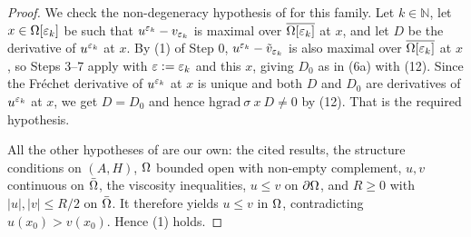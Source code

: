 \begin{proof}
We check the non-degeneracy hypothesis of  for this
family. Let $k\in\mathbb N$, let $x\in\Omega[\varepsilon_k]$ be such that $u^{\varepsilon_k}-v_{\varepsilon_k}$ is
maximal over $\overline{\Omega[\varepsilon_k]}$ at $x$, and let $D$ be the derivative of $u^{\varepsilon_k}$
at $x$. By (1) of Step 0, $u^{\varepsilon_k}-\tilde v_{\varepsilon_k}$ is also maximal over
$\overline{\Omega[\varepsilon_k]}$ at $x$, so Steps 3--7 apply with $\varepsilon:=\varepsilon_k$ and this $x$, giving
$D_0$ as in (6a) with (12). Since the Fréchet derivative of $u^{\varepsilon_k}$ at $x$ is unique and
both $D$ and $D_0$ are derivatives of $u^{\varepsilon_k}$ at $x$, we get $D=D_0$ and hence
$\mathrm{hgrad}\ \sigma\ x\ D\ne0$ by (12). That is the required hypothesis.

All the other hypotheses of  are our own: the cited
results, the structure conditions on $(A,H)$, $\Omega$ bounded open with non-empty complement,
$u,v$ continuous on $\bar{\Omega}$, the viscosity inequalities, $u\le v$ on $\partial\Omega$, and $R\ge0$
with $|u|,|v|\le R/2$ on $\bar{\Omega}$. It therefore yields $u\le v$ in $\Omega$, contradicting
$u(x_0)>v(x_0)$. Hence (1) holds.


\end{proof}
